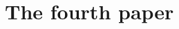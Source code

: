 \chapter{The fourth paper}
\label{ch:fourth_paper}


\begingroup
\endgroup


\chapabstract{
    \lipsum[1]
}

\lipsum[1-5]
